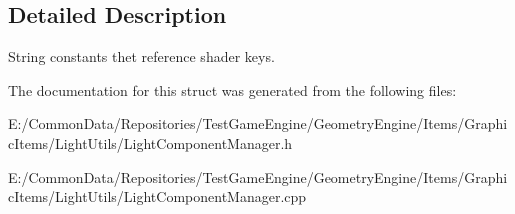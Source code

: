 \subsection{Detailed Description}
String constants thet reference shader keys. 

The documentation for this struct was generated from the following files\+:\begin{DoxyCompactItemize}
\item 
E\+:/\+Common\+Data/\+Repositories/\+Test\+Game\+Engine/\+Geometry\+Engine/\+Items/\+Graphic\+Items/\+Light\+Utils/Light\+Component\+Manager.\+h\item 
E\+:/\+Common\+Data/\+Repositories/\+Test\+Game\+Engine/\+Geometry\+Engine/\+Items/\+Graphic\+Items/\+Light\+Utils/Light\+Component\+Manager.\+cpp\end{DoxyCompactItemize}
